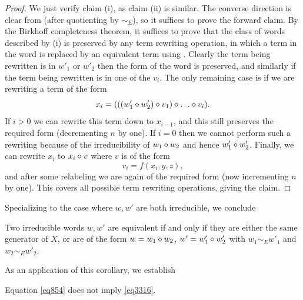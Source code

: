 \begin{proof}  We just verify claim (i), as claim (ii) is similar.  The converse direction is clear from  (after quotienting by $\sim_E$), so it suffices to prove the forward claim. By the Birkhoff completeness theorem, it suffices to prove that the class of words described by (i) is preserved by any term rewriting operation, in which a term in the word is replaced by an equivalent term using .  Clearly the term being rewritten is in $w'_1$ or $w'_2$ then the form of the word is preserved, and similarly if the term being rewritten is in one of the $v_i$.  The only remaining case is if we are rewriting a term of the form
$$ x_i = (((w'_1 \op w'_2) \op v_1) \op \dots \op v_i).$$
If $i>0$ we can rewrite this term down to $x_{i-1}$, and this still preserves the required form (decrementing $n$ by one).  If $i=0$ then we cannot perform such a rewriting because of the irreducibility of $w_1 \diamond w_2$ and hence $w'_1 \diamond w'_2$.  Finally, we can rewrite $x_i$ to $x_i \diamond v$ where $v$ is of the form
$$ v_i = f(x_i,y,z),$$
and after some relabeling we are again of the required form (now incrementing $n$ by one). This covers all possible term rewriting operations, giving the claim.
\end{proof}

Specializing to the case where $w,w'$ are both irreducible, we conclude

\begin{corollary}\label{unique factorization}  Two irreducible words $w, w'$ are equivalent if and only if they are either the same generator of $X$, or are of the form $w = w_1 \diamond w_2$, $w' = w'_1 \diamond w'_2$ with $w_1 \sim_E w'_1$ and $w_2 \sim_E w'_2$.
\end{corollary}

As an application of this corollary, we establish

\begin{proposition}\label{854-3316} Equation \eqref{eq854} does not imply \eqref{eq3316}.
\end{proposition}

